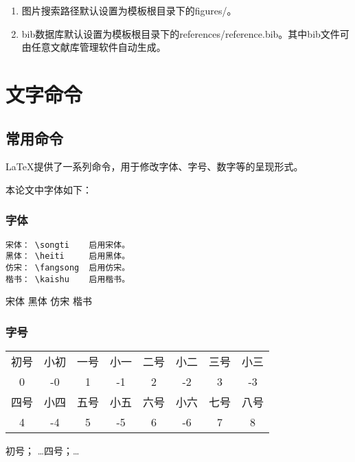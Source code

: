 \begin{enumerate}[label=(\arabic*)]
    \item 图片搜索路径默认设置为模板根目录下的figures/。
    \item bib数据库默认设置为模板根目录下的references/reference.bib。其中bib文件可由任意文献库管理软件自动生成。
\end{enumerate}

\section{文字命令}
\subsection{常用命令}
\LaTeX 提供了一系列命令，用于修改字体、字号、数字等的呈现形式。

本论文中字体如下：
\subsubsection{字体}
\begin{verbatim}
宋体： \songti    启用宋体。
黑体： \heiti     启用黑体。
仿宋： \fangsong  启用仿宋。
楷书： \kaishu    启用楷书。
\end{verbatim}
{\songti 宋体} {\heiti 黑体}    {\fangsong 仿宋}     {\kaishu 楷书}
\subsubsection{字号}%
\begin{center}
	\begin{tabular}{cccccccc}
		\toprule
		初号 & 小初 & 一号 & 小一 & 二号 & 小二 & 三号 & 小三 \\
		0 & -0 & 1 & -1 & 2 & -2 & 3 & -3 \\
		\hline
		四号 & 小四 & 五号 & 小五 & 六号 & 小六 & 七号 & 八号 \\
		4 & -4 & 5 & -5 & 6 & -6 & 7 & 8 \\
		\bottomrule
	\end{tabular}
\end{center}
{初号}； \dots {四号}；\dots {}